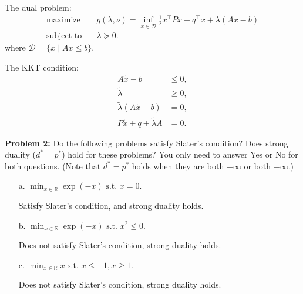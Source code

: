 \documentclass{article}
\begin{document}
\begin{enumerate}
The dual problem:
$$
\begin{aligned}
\text{maximize}\quad &g(\lambda, \nu) = \inf_{x\in \mathcal{D}} \frac{1}{2}x^\top Px + q^\top x + \lambda (Ax-b)
\\
\text{subject to}\quad &\lambda\succeq 0.
\end{aligned}
$$
where $\mathcal{D} = \{x\mid Ax\le b\}$.

The KKT condition:
$$
\begin{aligned}
A\tilde{x} - b &\le 0, \\
\tilde\lambda &\ge 0,  \\
\tilde\lambda(A\tilde{x} - b) &= 0, \\
P\tilde{x}+q +\tilde{\lambda}A &= 0.
\end{aligned}
$$

\end{enumerate}

\noindent\textbf{Problem 2:} Do the following problems satisfy Slater's condition? Does strong duality ($d^*=p^*$) hold for these problems? You only need to answer Yes or No for both questions. (Note that $d^*=p^*$ holds when they are both $+\infty$ or both $-\infty$.)
\begin{enumerate}
	\item[a.]  $\min_{x\in\mathbb{R}} \exp(-x)\text{ s.t. }x=0$.

	Satisfy Slater's condition, and strong duality holds.

	\item[b.]  $\min_{x\in\mathbb{R}} \exp(-x)\text{ s.t. }x^2\leq0$.

	Does not satisfy Slater's condition, strong duality holds.

	\item[c.]  $\min_{x\in\mathbb{R}} x\text{ s.t. }x\leq-1, x\geq 1$.

	Does not satisfy Slater's condition, strong duality holds.

\end{enumerate}
\bigskip
\end{document}
